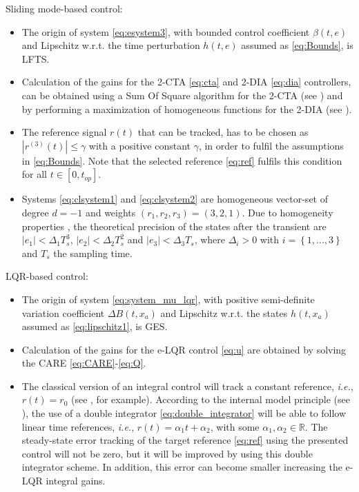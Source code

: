 \documentclass[journal,twoside,web]{ieeecolor}
\newcommand{\abs}[1]{\left| #1 \right|}
\begin{document}
Sliding mode-based control:
\begin{itemize}
  \item The origin of system \eqref{eq:esystem3}, with bounded control coefficient $\beta(t,e)$ and Lipschitz w.r.t. the time perturbation $h(t,e)$ assumed as \eqref{eq:Bounds}, is LFTS.
  \item Calculation of the gains for the 2-CTA \eqref{eq:cta} and 2-DIA \eqref{eq:dia} controllers, can be obtained using a Sum Of Square algorithm for the 2-CTA (see \cite{b:Torres-Sanchez-Fridman-Moreno}) and by performing a maximization of homogeneous functions for the 2-DIA (see \cite{b:MERCADOURIBE2020109018,b:Gutierrez-Mercado-Moreno-Fridman-IJRNC2020}).
  \item The reference signal $r(t)$ that can be tracked, has to be chosen as $\abs{{r}^{(3)}(t)}\leq \gamma$ with a positive constant $\gamma$, in order to fulfil the assumptions in \eqref{eq:Bounds}. Note that the selected reference \eqref{eq:ref} fulfils this condition for all $t\in [0,t_{op}]$.
  \item Systems \eqref{eq:clsystem1} and \eqref{eq:clsystem2} are homogeneous vector-set of degree $d=-1$ and weights $({r}_{1},{r}_{2},{r}_{3})=(3,2,1)$. Due to homogeneity properties \cite{b:levant_automatica2005}, the theoretical precision of the states after the transient are $\left| { e }_{ 1 } \right| < \Delta_1 T_s^3$, $\left| { e }_{ 2 } \right| < \Delta_2 T_s^2$ and $\left| { e }_{ 3 } \right| < \Delta_3 T_s$, where $\Delta_i>0$ with $i=\left\{1,...,3\right\}$ and $T_s$ the sampling time.
\end{itemize}

LQR-based control:
\begin{itemize}
  \item The origin of system \eqref{eq:system_mu_lqr}, with positive semi-definite variation coefficient $\Delta B(t,x_a)$ and Lipschitz w.r.t. the states $h(t,x_a)$ assumed as \eqref{eq:lipschitz1}, is GES.
  \item Calculation of the gains for the e-LQR control \eqref{eq:u} are obtained by solving the CARE \eqref{eq:CARE}-\eqref{eq:Q}.
  \item  The classical version of an integral control will track a constant reference, \textit{i.e.}, $r(t)=r_0$ (see \cite[Chapter 12]{b:Khalil2002}, for example). According to the internal model principle (see \cite{b:Francis-Wonhamm-1976}), the use of a double integrator \eqref{eq:double_integrator} will be able to follow linear time references, \textit{i.e.}, $r(t)=\alpha_1 t+\alpha_2$, with some $\alpha_1,\alpha_2 \in \mathbb{R}$. The steady-state error tracking of the target reference \eqref{eq:ref} using the presented control will not be zero, but it will be improved by using this double integrator scheme. In addition, this error can become smaller increasing the e-LQR integral gains.
\end{itemize}
\end{document}
